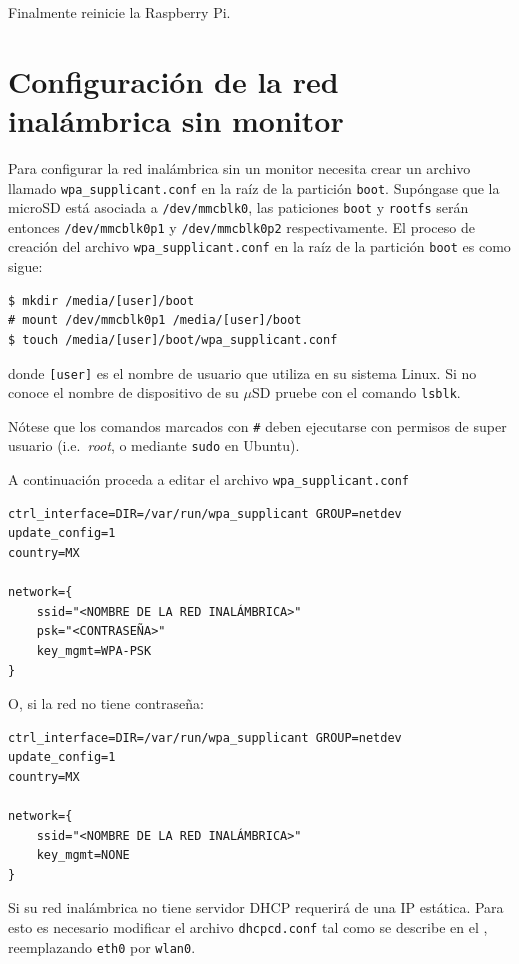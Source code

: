 \documentclass[letterpaper,10.5pt]{article}
\begin{document}
\noindent
Finalmente reinicie la Raspberry Pi.


\section{Configuración de la red inalámbrica sin monitor}%
\label{sec:setup-wifi}
Para configurar la red inalámbrica sin un monitor necesita crear un archivo  llamado \texttt{wpa\_supplicant.conf} en la raíz de la partición \texttt{boot}.
Supóngase que la microSD está asociada a \texttt{/dev/mmcblk0}, las paticiones \texttt{boot} y \texttt{rootfs} serán entonces \texttt{/dev/mmcblk0p1} y \texttt{/dev/mmcblk0p2} respectivamente.
El proceso de creación del archivo \texttt{wpa\_supplicant.conf} en la raíz de la partición \texttt{boot} es como sigue:

\begin{Verbatim}[fontsize=\footnotesize]
$ mkdir /media/[user]/boot
# mount /dev/mmcblk0p1 /media/[user]/boot
$ touch /media/[user]/boot/wpa_supplicant.conf
\end{Verbatim}

\noindent donde \texttt{[user]} es el nombre de usuario que utiliza en su sistema Linux.
Si no conoce el nombre de dispositivo de su $\mu$SD pruebe con el comando \texttt{lsblk}.

Nótese que los comandos marcados con \texttt{\#} deben ejecutarse con permisos de super usuario (i.e.~\emph{root}, o mediante \texttt{sudo} en Ubuntu).

A continuación proceda a editar el archivo \texttt{wpa\_supplicant.conf}

\begin{Verbatim}[fontsize=\footnotesize]
ctrl_interface=DIR=/var/run/wpa_supplicant GROUP=netdev
update_config=1
country=MX

network={
    ssid="<NOMBRE DE LA RED INALÁMBRICA>"
    psk="<CONTRASEÑA>"
    key_mgmt=WPA-PSK
}
\end{Verbatim}

O, si la red no tiene contraseña:

\begin{Verbatim}[fontsize=\footnotesize]
ctrl_interface=DIR=/var/run/wpa_supplicant GROUP=netdev
update_config=1
country=MX

network={
    ssid="<NOMBRE DE LA RED INALÁMBRICA>"
    key_mgmt=NONE
}
\end{Verbatim}

Si su red inalámbrica no tiene servidor DHCP requerirá de una IP estática.
Para esto es necesario modificar el archivo \texttt{dhcpcd.conf} tal como se describe en el , reemplazando \texttt{eth0} por \texttt{wlan0}.
\end{document}
